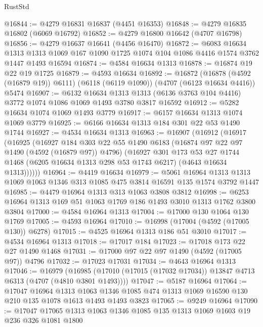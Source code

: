\begin{lexlean}{RustStd}
\begin{coremodule}
@16844 := @4279 @16831 @16837 (@4451 @16353)
@16848 := @4279 @16835 @16802 (@6069 @16792)
@16852 := @4279 @16800 @16642 (@4707 @16798)
@16856 := @4279 @16637 @16641 (@4456 @16470)
@16872 := @6083
    @16634
    @1313
    @1313
    @1069
    @167
    @1090
    @1725
    @1074
    @104
    @1086
    @4416
    @1574
    @3762
    @1447
    @1493
    @16594
@16874 := @4584 @16634 @1313
@16878 := @16874 @19 @22 @19 @1725
@16879 := @4593 @16634
@16892 := @16872
    (@16878 (@4592 (@16879 @19)) @6111)
    (@6118 (@6119 @1090))
    (@4707 (@6123 @16634 @4416))
    @5474
@16907 := @6132
    @16634
    @1313
    @1313
    (@6136 @3763 @104 @4416)
    @3772
    @1074
    @1086
    @1069
    @1493
    @3780
    @3817
    @16592
@16912 := @5282 @16634 @1074 @1069 @1493 @3779
@16917 := @6157 @16634 @1313 @1074 @1069 @3779
@16925 := @6166 @16634 @1313 @184 @301 @22 @53 @1490 @1744
@16927 := @4534 @16634 @1313
@16963 := @16907
    (@16912
      (@16917
        (@16925
          (@16927
            @184
            @303
            @22
            @55
            @1490
            @6183
            (@16874 @97 @22 @97 @1490 (@4592 (@16879 @97)) @4796)
            (@16927
              @301
              @173
              @53
              @27
              @1744
              @1468
              (@6205 @16634 @1313 @298 @53 @1743 @6217)
              (@4643 @16634 @1313))))))
@16964 := @4419 @16634
@16979 := @5061
    @16964
    @1313
    @1313
    @1069
    @1063
    @1346
    @313
    @1085
    @475
    @3814
    @16591
    @135
    @1574
    @3792
    @1447
@16985 := @4479 @16964 @1313 @313 @1063 @3808 @3812
@16998 := @6253 @16964 @1313 @169 @51 @1063 @1769 @186 @1493 @3010 @1313 @1762 @3800 @3804
@17000 := @4584 @16964 @1313
@17004 := @17000 @130 @1064 @130 @1769
@17005 := @4593 @16964
@17010 := @16998 (@17004 (@4592 (@17005 @130)) @6278)
@17015 := @4525 @16964 @1313 @186 @51 @3010
@17017 := @4534 @16964 @1313
@17018 := @17017 @184
@17023 := @17018 @173 @22 @27 @1490 @1468
@17031 := @17000 @97 @22 @97 @1490 (@4592 (@17005 @97)) @4796
@17032 := @17023 @17031
@17034 := @4643 @16964 @1313
@17046 := @16979
    (@16985 (@17010 (@17015 (@17032 @17034)) @13847 @4713 @6313 (@4707 (@4810 @3801 @1493))))
@17047 := @5187 @16964
@17064 := @17047
    @16964
    @1313
    @1063
    @1346
    @1085
    @474
    @1313
    @1069
    @16590
    @130
    @210
    @135
    @1078
    @1613
    @1493
    @1493
    @3823
@17065 := @9249 @16964
@17090 := @17047
    @17065
    @1313
    @1063
    @1346
    @1085
    @135
    @1313
    @1069
    @1603
    @19
    @236
    @326
    @1081
    @1800

\end{coremodule}
\end{lexlean}
